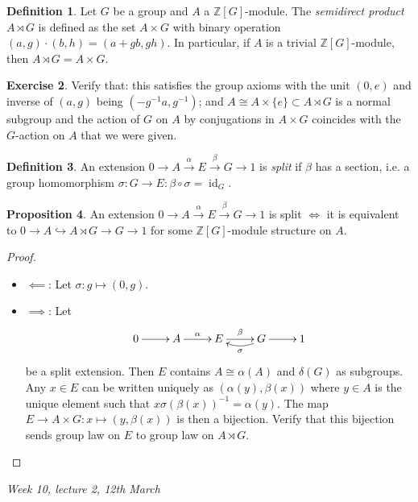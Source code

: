 \documentclass{article}
\newcommand{\Z}{\mathbb{Z}}
\newcommand{\id}{\operatorname{id}}
\theoremstyle{definition}
\newtheorem{defn}{Definition}[subsection]
\newtheorem{prop}[defn]{Proposition}
\newtheorem{exe}[defn]{Exercise}
\begin{document}
\begin{defn}
Let $G$ be a group and $A$ a $\Z[G]$-module. The \textit{semidirect product} $A\rtimes G$ is defined as the set $A\times G$ with binary operation $(a,g)\cdot (b,h)=(a+gb,gh)$. In particular, if $A$ is a trivial $\Z[G]$-module, then $A\rtimes G=A\times G$.
\end{defn}
\begin{exe}
Verify that: this satisfies the group axioms with the unit $(0,e)$ and inverse of $(a,g)$ being $\left(-g^{-1}a,g^{-1}\right)$; and $A\cong A\times\{e\}\subset A\rtimes G$ is a normal subgroup and the action of $G$ on $A$ by conjugations in $A\times G$ coincides with the $G$-action on $A$ that we were given.
\end{exe}

\begin{defn}
An extension $0\rightarrow A\xrightarrow{\alpha}E\xrightarrow{\beta} G\rightarrow 1$ is \textit{split} if $\beta$ has a section, i.e. a group homomorphism $\sigma:G\rightarrow E:\beta\circ\sigma=\id_G$.
\end{defn}

\begin{prop}
An extension $0\rightarrow A\xrightarrow{\alpha}E\xrightarrow{\beta} G\rightarrow 1$ is split $\iff$ it is equivalent to $0\rightarrow A\hookrightarrow A\rtimes G\rightarrow G\rightarrow 1$ for some $\Z[G]$-module structure on $A$.
\end{prop}
\begin{proof}
\begin{itemize}
\item $\impliedby$: Let $\sigma:g\mapsto (0,g)$.
\item $\implies$: Let
\[
\xymatrix{
0\ar[r] & A\ar[r]^\alpha & E\ar[r]^\beta & G\ar@/^/[l]^\sigma\ar[r] & 1
}
\]
be a split extension. Then $E$ contains $A\cong\alpha(A)$ and $\delta(G)$ as subgroups. Any $x\in E$ can be written uniquely as $(\alpha(y),\beta(x))$ where $y\in A$ is the unique element such that $x\sigma(\beta(x))^{-1}=\alpha(y)$. The map $E\rightarrow A\times G:x\mapsto (y,\beta(x))$ is then a bijection. Verify that this bijection sends group law on $E$ to group law on $A\rtimes G$.
\end{itemize}
\end{proof}

\begin{flushright}
\textit{Week 10, lecture 2, 12th March}
\end{flushright}
\end{document}
